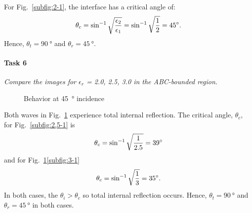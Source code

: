 For Fig.~\ref{subfig:2-1}, the interface has a critical angle of:
\begin{equation*}
	\theta_c = \sin^{-1} \sqrt{{\epsilon_2 \over \epsilon_1}} = \sin^{-1} \sqrt{{1 \over 2}} = \SI{45}{\degree}.
\end{equation*}
Hence, $\theta_t = \SI{90}{\degree}$ and $\theta_r = \SI{45}{\degree}$.

\pagebreak
\paragraph{Task 6}\textit{Compare the images for $\epsilon_r$ = 2.0, 2.5, 3.0 in the ABC-bounded region.}

\begin{figure}[htpb]
	\caption{Behavior at \SI{45}{\degree} incidence}
	\label{fig:TIR}
\end{figure}

Both waves in Fig.~\ref{fig:TIR} experience total internal reflection.
The critical angle, $\theta_c$, for Fig.~\ref{subfig:2,5-1} is
\begin{equation*}
	\theta_c = \sin^{-1} \sqrt{{1 \over 2.5}} = \SI{39}{\degree}
\end{equation*}
and for Fig.~\ref{fig:TIR}\ref{subfig:3-1}
\begin{equation*}
	\theta_c = \sin^{-1} \sqrt{{1 \over 3}} = \SI{35}{\degree}.
\end{equation*}
In both cases, the $\theta_i > \theta_c$ so total internal reflection occurs.
Hence, $\theta_t = \SI{90}{\degree}$ and $\theta_r = \SI{45}{\degree}$ in both cases.

